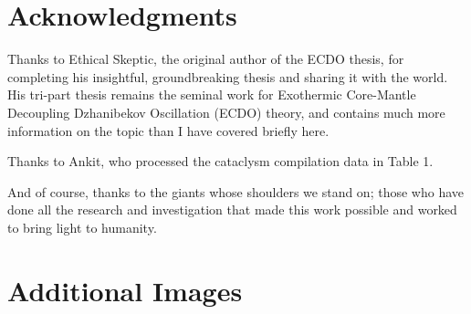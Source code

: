 \documentclass[10pt,twocolumn,letterpaper]{article}
\begin{document}
\section{Acknowledgments}

Thanks to Ethical Skeptic, the original author of the ECDO thesis, for completing his insightful, groundbreaking thesis and sharing it with the world. His tri-part thesis \cite{1} remains the seminal work for Exothermic Core-Mantle Decoupling Dzhanibekov Oscillation (ECDO) theory, and contains much more information on the topic than I have covered briefly here.

Thanks to Ankit, who processed the cataclysm compilation data in Table 1.

And of course, thanks to the giants whose shoulders we stand on; those who have done all the research and investigation that made this work possible and worked to bring light to humanity.

\clearpage
\twocolumn

\section{Additional Images}
\end{document}
